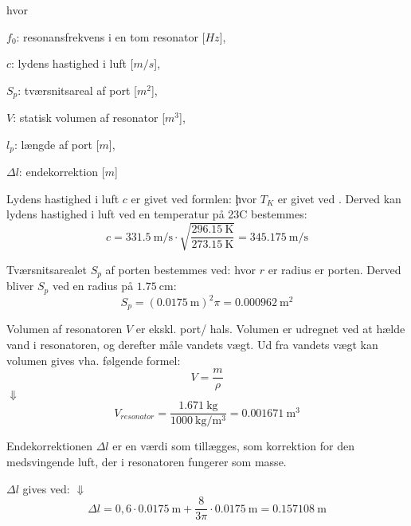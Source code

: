 hvor 
\begin{description}[align=left, labelwidth=1in,labelindent=0.5cm]
\item $f_{0}$: resonansfrekvens i en tom resonator [$Hz$],\\
\item $c$: lydens hastighed i luft [$m/s$],\\
\item $S_{p}$: tværsnitsareal af port [$m^2$],\\
\item $V$: statisk volumen af resonator [$m^3$],\\
\item $l_{p}$: længde af port [$m$],\\
\item $\Delta l$: endekorrektion [$m$]\\
\end{description}
Lydens hastighed i luft $c$ er givet ved formlen: 
\c
hvor $T_{K}$ er givet ved \T. 
Derved kan lydens hastighed i luft ved en temperatur på 23\degree C bestemmes: 
\begin{equation}
		c = {\SI{331,5}{\meter / \second}} \cdot
		\sqrt{\frac{\SI{296,15}{\kelvin}}{\SI{273,15}{\kelvin}}} = {\SI{345,175}{\meter / \second}} 	\end{equation}
		
Tværsnitsarealet $S_{p}$ af porten bestemmes ved: 
\Sp 
hvor ${r}$ er radius er porten. 
Derved bliver $S_{p}$ ved en radius på ${\SI{1.75}{\centi \meter}}$:  
\begin{equation}
S_{p} = ({\SI{0,0175}{\meter}})^{2}\pi = {\SI{0,000962}{\meter^{2}}}	
\end{equation}  

Volumen af resonatoren $V$ er ekskl. port/ hals. Volumen er udregnet ved at hælde vand i resonatoren, og derefter måle vandets vægt. Ud fra vandets vægt kan volumen gives vha. følgende formel:  
\begin{equation}
  V=\frac{m}{\rho}
  \label{eq:vformel}
\end{equation}
$\Downarrow$
\begin{equation}
V_{resonator}=\frac{\SI{1,671}{\kilo\gram}}{\SI{1000}{\kilo \gram \per \meter^{3}}}={\SI{0,001671}{\meter^{3}}}
\end{equation}

Endekorrektionen $\Delta l$ er en værdi som tillægges, som korrektion for den medsvingende luft, der i resonatoren fungerer som masse. 

$\Delta l$ gives ved: \deltal
$\Downarrow$
\begin{equation}
		\Delta l = 0,6 \cdot {\SI{0,0175}{\meter}} + \frac{8}{3\pi} \cdot {\SI{0,0175}{\meter}} = {\SI{0,157108}{\meter}} 
\end{equation}

